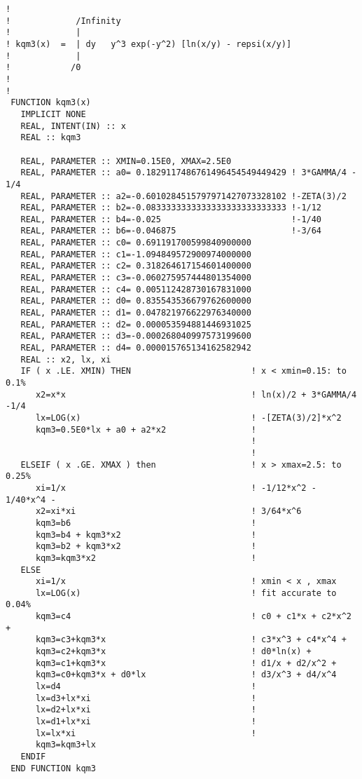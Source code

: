 \documentclass[preprint,12pt,eqsecnum,nofootinbib,amsmath,amssymb]{revtex4}
\begin{document}
{\begin{verbatim}
!
!             /Infinity
!             |
! kqm3(x)  =  | dy   y^3 exp(-y^2) [ln(x/y) - repsi(x/y)]
!             |
!            /0
!
!
 FUNCTION kqm3(x)  
   IMPLICIT NONE
   REAL, INTENT(IN) :: x
   REAL :: kqm3

   REAL, PARAMETER :: XMIN=0.15E0, XMAX=2.5E0 
   REAL, PARAMETER :: a0= 0.1829117486761496454549449429 ! 3*GAMMA/4 - 1/4
   REAL, PARAMETER :: a2=-0.6010284515797971427073328102 !-ZETA(3)/2
   REAL, PARAMETER :: b2=-0.0833333333333333333333333333 !-1/12
   REAL, PARAMETER :: b4=-0.025                          !-1/40
   REAL, PARAMETER :: b6=-0.046875                       !-3/64
   REAL, PARAMETER :: c0= 0.691191700599840900000
   REAL, PARAMETER :: c1=-1.094849572900974000000
   REAL, PARAMETER :: c2= 0.318264617154601400000
   REAL, PARAMETER :: c3=-0.060275957444801354000
   REAL, PARAMETER :: c4= 0.005112428730167831000
   REAL, PARAMETER :: d0= 0.835543536679762600000
   REAL, PARAMETER :: d1= 0.047821976622976340000
   REAL, PARAMETER :: d2= 0.000053594881446931025
   REAL, PARAMETER :: d3=-0.000268040997573199600
   REAL, PARAMETER :: d4= 0.000015765134162582942
   REAL :: x2, lx, xi
   IF ( x .LE. XMIN) THEN                        ! x < xmin=0.15: to 0.1%
      x2=x*x                                     ! ln(x)/2 + 3*GAMMA/4 -1/4
      lx=LOG(x)                                  ! -[ZETA(3)/2]*x^2
      kqm3=0.5E0*lx + a0 + a2*x2                 ! 
                                                 ! 
                                                 !
   ELSEIF ( x .GE. XMAX ) then                   ! x > xmax=2.5: to 0.25%
      xi=1/x                                     ! -1/12*x^2 - 1/40*x^4 -
      x2=xi*xi                                   ! 3/64*x^6
      kqm3=b6                                    !
      kqm3=b4 + kqm3*x2                          !
      kqm3=b2 + kqm3*x2                          !
      kqm3=kqm3*x2                               !
   ELSE
      xi=1/x                                     ! xmin < x , xmax
      lx=LOG(x)                                  ! fit accurate to 0.04%
      kqm3=c4                                    ! c0 + c1*x + c2*x^2 +
      kqm3=c3+kqm3*x                             ! c3*x^3 + c4*x^4 +
      kqm3=c2+kqm3*x                             ! d0*ln(x) +
      kqm3=c1+kqm3*x                             ! d1/x + d2/x^2 +
      kqm3=c0+kqm3*x + d0*lx                     ! d3/x^3 + d4/x^4
      lx=d4                                      !
      lx=d3+lx*xi                                !
      lx=d2+lx*xi                                !
      lx=d1+lx*xi                                !
      lx=lx*xi                                   !
      kqm3=kqm3+lx
   ENDIF
 END FUNCTION kqm3
\end{verbatim}
}
\end{document}
